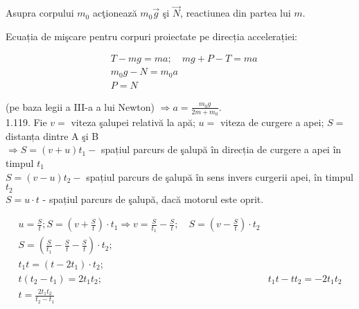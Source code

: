 Asupra corpului $m_{0}$ acţionează $m_{0} \vec{g}$ şi $\vec{N}$, reactiunea din partea lui $m$.

Ecuația de mişcare pentru corpuri proiectate pe direcția accelerației:

$$
\begin{aligned}
& T-m g=m a ; \quad m g+P-T=m a \\
& m_{0} g-N=m_{0} a \\
& P=N
\end{aligned}
$$

(pe baza legii a III-a a lui Newton) $\Rightarrow a=\frac{m_{0} g}{2 m+m_{0}}$.\\
1.119. Fie $v=$ viteza şalupei relativă la apă; $u=$ viteza de curgere a apei; $S=$ distanța dintre A şi B\\
$\Rightarrow S=(v+u) t_{1}-$ spațiul parcurs de şalupă în direcția de curgere a apei în timpul $t_{1}$\\
$S=(v-u) t_{2}-$ spațiul parcurs de şalupă în sens invers curgerii apei, în timpul $t_{2}$\\
$S=u \cdot t$ - spațiul parcurs de şalupă, dacă motorul este oprit.

$$
\begin{array}{ll}
u=\frac{S}{t} ; S=\left(v+\frac{S}{t}\right) \cdot t_{1} \Rightarrow v=\frac{S}{t_{1}}-\frac{S}{t} ; \quad S=\left(v-\frac{S}{t}\right) \cdot t_{2} \\
S=\left(\frac{S}{t_{1}}-\frac{S}{t}-\frac{S}{t}\right) \cdot t_{2} ; \\
t_{1} t=\left(t-2 t_{1}\right) \cdot t_{2} ; \\
t\left(t_{2}-t_{1}\right)=2 t_{1} t_{2} ; & t_{1} t-t t_{2}=-2 t_{1} t_{2} \\
t=\frac{2 t_{1} t_{2}}{t_{2}-t_{1}}
\end{array}
$$


